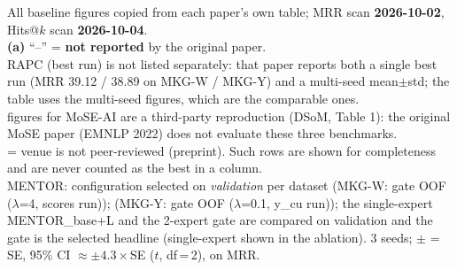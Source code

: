 \begin{table}[t]
\vspace{2pt}
\begin{minipage}{\linewidth}\footnotesize\raggedright
All baseline figures copied from each paper's own table; MRR scan \textbf{2026-10-02}, Hits@$k$ scan \textbf{2026-10-04}. \\
\textbf{(a)} ``--'' = \textbf{not reported} by the original paper. \\
RAPC (best run) is not listed separately: that paper reports both a single best run (MRR 39.12 / 38.89 on MKG-W / MKG-Y) and a multi-seed mean$\pm$std; the table uses the multi-seed figures, which are the comparable ones. \\
\dag{} figures for MoSE-AI are a third-party reproduction (DSoM, Table 1): the original MoSE paper (EMNLP 2022) does not evaluate these three benchmarks. \\
\ddag{} = venue is not peer-reviewed (preprint). Such rows are shown for completeness and are never counted as the best in a column. \\
MENTOR: configuration selected on \emph{validation} per dataset (MKG-W: gate OOF ($\lambda$=4, scores run)); (MKG-Y: gate OOF ($\lambda$=0.1, y\_cu run)); the single-expert MENTOR\_base+L and the 2-expert gate are compared on validation and the gate is the selected headline (single-expert shown in the ablation). 3 seeds; $\pm$ = SE, 95\% CI $\approx \pm 4.3\times$SE ($t$, df\,=\,2), on MRR. \\
\end{minipage}
\end{table}
